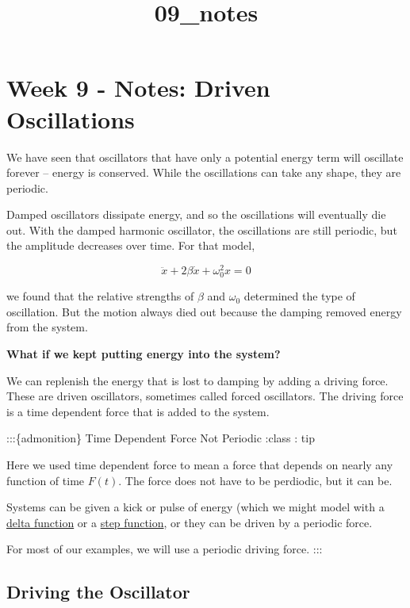 \documentclass[11pt]{article}
\title{09\_notes}
\begin{document}
    
    \maketitle
    
    

    
    \section{Week 9 - Notes: Driven
Oscillations}\label{week-9---notes-driven-oscillations}

We have seen that oscillators that have only a potential energy term
will oscillate forever -- energy is conserved. While the oscillations
can take any shape, they are periodic.

Damped oscillators dissipate energy, and so the oscillations will
eventually die out. With the damped harmonic oscillator, the
oscillations are still periodic, but the amplitude decreases over time.
For that model,

\[\ddot{x} + 2\beta \dot{x} + \omega_0^2 x = 0\]

we found that the relative strengths of \(\beta\) and \(\omega_0\)
determined the type of oscillation. But the motion always died out
because the damping removed energy from the system.

\textbf{What if we kept putting energy into the system?}

We can replenish the energy that is lost to damping by adding a driving
force. These are driven oscillators, sometimes called forced
oscillators. The driving force is a time dependent force that is added
to the system.

:::\{admonition\} Time Dependent Force Not Periodic :class : tip

Here we used time dependent force to mean a force that depends on nearly
any function of time \(F(t)\). The force does not have to be perdiodic,
but it can be.

Systems can be given a kick or pulse of energy (which we might model
with a \href{https://en.wikipedia.org/wiki/Delta_function}{delta
function} or a
\href{https://en.wikipedia.org/wiki/Heaviside_step_function}{step
function}, or they can be driven by a periodic force.

For most of our examples, we will use a periodic driving force. :::

    \subsection{Driving the Oscillator}\label{driving-the-oscillator}
\end{document}
